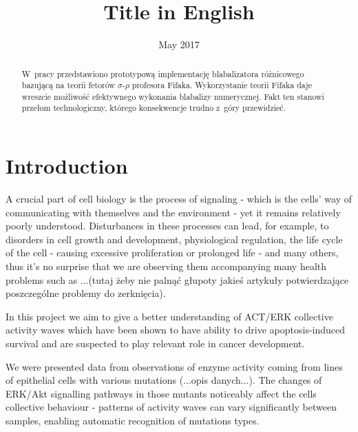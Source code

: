 \documentclass[licencjacka,en]{pracamgr}
\title{Title in English}
\date{May 2017}
\begin{document}
\maketitle

\begin{abstract}
  W~pracy przedstawiono prototypową implementację blabalizatora
  różnicowego bazującą na teorii fetorów $\sigma$-$\rho$ profesora
  Fifaka.  Wykorzystanie teorii Fifaka daje wreszcie możliwość
  efektywnego wykonania blabalizy numerycznej.  Fakt ten stanowi
  przełom technologiczny, którego konsekwencje trudno z~góry
  przewidzieć.
\end{abstract}

\tableofcontents

\chapter*{Introduction}

A crucial part of cell biology is the process of signaling - which is the cells' way of communicating with themselves and the environment - yet it remains relatively poorly understood. Disturbances in these processes can lead, for example, to disorders in cell growth and development, physiological regulation, the life cycle of the cell - causing excessive proliferation or prolonged life - and many others, thus it's no surprise that we are observing them accompanying many health problems such as ...(tutaj żeby nie palnąć głupoty jakieś artykuły potwierdzające poszczególne problemy do zerknięcia).

In this project we aim to give a better understanding of ACT/ERK collective activity waves which have been shown to have ability to drive apoptosis-induced survival and are suspected to play relevant role in cancer development.


We were presented data from observations of enzyme activity 
coming from lines of epithelial cells with various mutations (...opis danych...).
The changes of ERK/Akt signalling pathways in those mutants noticeably affect the cells collective behaviour - patterns of activity waves can vary significantly between samples, enabling automatic recognition of mutations types.

\end{document}
